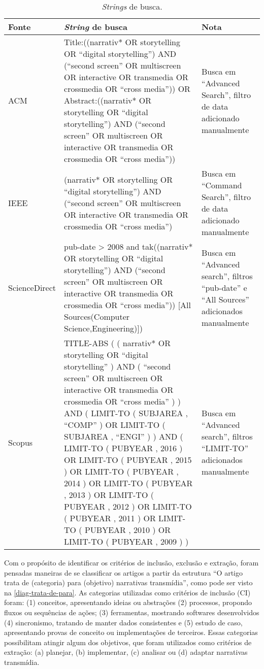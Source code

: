 \documentclass[
article,			%
11pt,				%
oneside,			%
a4paper,			%
english,			%
brazil,				%
sumario=tradicional
]{abntex2}
\begin{document}
  \begin{table}[htb]
    \ABNTEXfontereduzida
    \caption[\textit{Strings} de busca]{\textit{Strings} de busca.}
    \label{tab-queries2}
    \begin{tabular}{p{2.0cm}|p{9.3cm}|p{2.8cm}}
      \textbf{Fonte} & \textbf{\textit{String} de busca} & \textbf{Nota} \\
      \hline
      ACM & Title:((narrativ* OR storytelling OR ``digital storytelling'') AND (``second screen'' OR multiscreen OR interactive OR transmedia OR crossmedia OR ``cross media'')) OR Abstract:((narrativ* OR storytelling OR ``digital storytelling'') AND (``second screen'' OR multiscreen OR interactive OR transmedia OR crossmedia OR ``cross media'')) & Busca em ``Advanced Search'', filtro de data adicionado manualmente \\
      \hline
      IEEE & (narrativ* OR storytelling OR ``digital storytelling'') AND (``second screen'' OR multiscreen OR interactive OR transmedia OR crossmedia OR ``cross media'') & Busca em ``Command Search'', filtro de data adicionado manualmente \\
      \hline
      ScienceDirect & pub-date > 2008 and tak((narrativ* OR storytelling OR ``digital storytelling'') AND (``second screen'' OR multiscreen OR interactive OR transmedia OR crossmedia OR ``cross media'')) [All Sources(Computer Science,Engineering)]) & Busca em ``Advanced search'', filtros ``pub-date'' e ``All Sources'' adicionados manualmente \\
      \hline
      Scopus & TITLE-ABS ( ( narrativ*  OR  storytelling  OR  ``digital storytelling'' )  AND  ( ``second screen''  OR  multiscreen  OR  interactive  OR  transmedia  OR  crossmedia  OR  ``cross media'' ) )  AND  ( LIMIT-TO ( SUBJAREA ,  ``COMP'' )  OR  LIMIT-TO ( SUBJAREA ,  ``ENGI'' ) )  AND  ( LIMIT-TO ( PUBYEAR ,  2016 )  OR  LIMIT-TO ( PUBYEAR ,  2015 )  OR  LIMIT-TO ( PUBYEAR ,  2014 )  OR  LIMIT-TO ( PUBYEAR ,  2013 )  OR  LIMIT-TO ( PUBYEAR ,  2012 )  OR  LIMIT-TO ( PUBYEAR ,  2011 )  OR  LIMIT-TO ( PUBYEAR ,  2010 )  OR  LIMIT-TO ( PUBYEAR ,  2009 ) ) & Busca em ``Advanced search'', filtros ``LIMIT-TO'' adicionados manualmente \\
    \end{tabular}
  \end{table}

  Com o propósito de identificar os critérios de inclusão, exclusão e extração, foram pensadas maneiras de se classificar os artigos a partir da estrutura ``O artigo trata de (categoria) para (objetivo) narrativas transmídia'', como pode ser visto na \autoref{diag-trata-de-para}.
  As categorias utilizadas como critérios de inclusão (CI) foram: (1) conceitos, apresentando ideias ou abstrações (2) processos, propondo fluxos ou sequências de ações; (3) ferramentas, mostrando softwares desenvolvidos (4) sincronismo, tratando de manter dados consistentes e (5) estudo de caso, apresentando provas de conceito ou implementações de terceiros. Essas categorias possibilitam atingir algum dos objetivos, que foram utilizados como critérios de extração: (a) planejar, (b) implementar, (c) analisar ou (d) adaptar narrativas transmídia.
\end{document}
